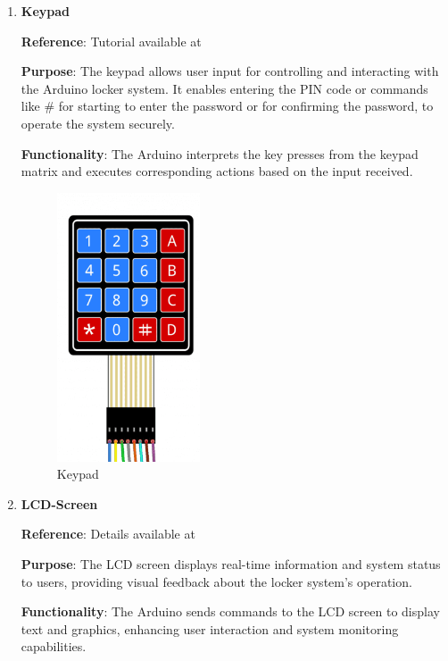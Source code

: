\begin{enumerate}
    \item \textbf{Keypad}  
    
    \textbf{Reference}: Tutorial available at \cite{keypad-tutorial}
    
    \textbf{Purpose}: The keypad allows user input for controlling and interacting with the Arduino locker system. It enables entering the PIN code or commands like \# for starting to enter the password or \* for confirming the password, to operate the system securely.
    
    \textbf{Functionality}: The Arduino interprets the key presses from the keypad matrix and executes corresponding actions based on the input received.
    
    \begin{figure}[h]
        \centering
        \includegraphics[width=0.4\textwidth]{images/Arduino/keypad_image.png} %
        \caption{Keypad}
    \end{figure}
\newpage

    \item \textbf{LCD-Screen}
    
    \textbf{Reference}: Details available at \cite{seeedstudio-lcd}
    
    \textbf{Purpose}: The LCD screen displays real-time information and system status to users, providing visual feedback about the locker system's operation.
    
    \textbf{Functionality}: The Arduino sends commands to the LCD screen to display text and graphics, enhancing user interaction and system monitoring capabilities.
    

\end{enumerate}
